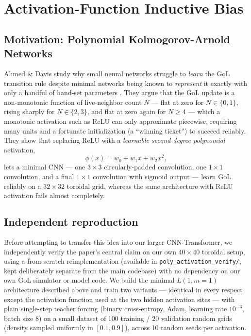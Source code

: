 \section{Activation-Function Inductive Bias}
\label{sec:verification}

\subsection{Motivation: Polynomial Kolmogorov-Arnold Networks}

Ahmed \& Davis \cite{ahmed2026polynomial} study why small neural networks
struggle to \emph{learn} the GoL transition rule despite minimal networks
being known to \emph{represent} it exactly with only a handful of
hand-set parameters \cite{springer2021minimal}. They argue that the GoL
update is a non-monotonic function of live-neighbor count $N$ --- flat at
zero for $N \in \{0,1\}$, rising sharply for $N \in \{2,3\}$, and flat at
zero again for $N \geq 4$ --- which a monotonic activation such as ReLU can
only approximate piecewise, requiring many units and a fortunate
initialization (a ``winning ticket'') to succeed reliably. They show that
replacing ReLU with a \emph{learnable second-degree polynomial} activation,
\[
  \phi(x) = w_0 + w_1 x + w_2 x^2,
\]
lets a minimal CNN --- one $3\times3$ circularly-padded convolution, one
$1\times1$ convolution, and a final $1\times1$ convolution with sigmoid
output --- learn GoL reliably on a $32\times32$ toroidal grid, whereas the
same architecture with ReLU activation fails almost completely.

\subsection{Independent reproduction}
\label{sec:reproduction}

Before attempting to transfer this idea into our larger CNN-Transformer, we
independently verify the paper's central claim on our own $40\times40$
toroidal setup, using a from-scratch reimplementation (available in
\texttt{poly\_activation\_verify/}, kept deliberately separate from the main
codebase) with no dependency on our own GoL simulator or model code. We
build the minimal $L(1,m{=}1)$ architecture described above and train two
variants --- identical in every respect except the activation function used
at the two hidden activation sites --- with plain single-step teacher
forcing (binary cross-entropy, Adam, learning rate $10^{-3}$, batch size
$8$) on a small dataset of 100 training / 20 validation random grids
(density sampled uniformly in $[0.1, 0.9]$), across 10 random seeds per
activation.

